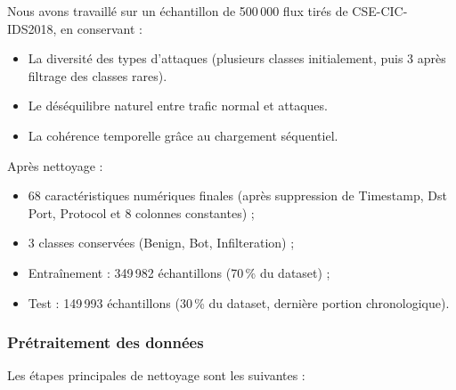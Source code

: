 ﻿\documentclass[11pt,a4paper]{article}
\begin{document}
Nous avons travaillé sur un échantillon de 500\,000 flux tirés de CSE-CIC-IDS2018, en conservant :
\begin{itemize}
    \item La diversité des types d'attaques (plusieurs classes initialement, puis 3 après filtrage des classes rares).
    \item Le déséquilibre naturel entre trafic normal et attaques.
    \item La cohérence temporelle grâce au chargement séquentiel.
\end{itemize}

Après nettoyage :
\begin{itemize}
    \item 68 caractéristiques numériques finales (après suppression de Timestamp, Dst Port, Protocol et 8 colonnes constantes) ;
    \item 3 classes conservées (Benign, Bot, Infilteration) ;
    \item Entraînement : 349\,982 échantillons (70\,\% du dataset) ;
    \item Test : 149\,993 échantillons (30\,\% du dataset, dernière portion chronologique).
\end{itemize}

\subsubsection{Prétraitement des données}

Les étapes principales de nettoyage sont les suivantes :
\end{document}
